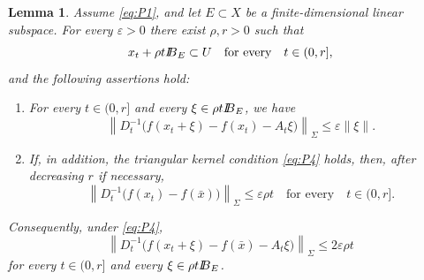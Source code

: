 \documentclass[10pt,a4paper]{amsart}
\newtheorem{lemma}{Lemma}
\def\ball{{I\kern -.35em B}}
\newcommand{\bx}{\bar x}
\begin{document}
	\begin{lemma}
		\label{lem:p-factor-scaled-error}
		Assume \eqref{eq:P1}, and let $E\subset X$ be a finite-dimensional
		linear subspace. For every $\varepsilon>0$ there exist $\rho,r>0$ such
		that
		$$
		x_t+\rho t\ball_E\subset U
		\quad\text{for every}\quad t\in(0,r],
		$$
		and the following assertions hold:
		\begin{enumerate}[label={\rm (\roman*)}]
			
			\item For every $t\in(0,r]$ and every $\xi\in\rho t\ball_E$, we have
			\begin{equation}
				\left\|D_t^{-1}
				\bigl(f(x_t+\xi)-f(x_t)-A_t\xi\bigr)
				\right\|_\Sigma
				\le\varepsilon\|\xi\|.
				\label{eq:P7}
			\end{equation}
			
			\item If, in addition, the triangular kernel condition
			\eqref{eq:P4} holds, then, after decreasing $r$ if necessary,
			\begin{equation}
				\left\|D_t^{-1}
				\bigl(f(x_t)-f(\bx)\bigr)
				\right\|_\Sigma
				\le\varepsilon\rho t
				\quad\text{for every}\quad t\in(0,r].
				\label{eq:P10}
			\end{equation}
			
		\end{enumerate}
		Consequently, under \eqref{eq:P4},
		\begin{equation}
			\left\|D_t^{-1}
			\bigl(f(x_t+\xi)-f(\bx)-A_t\xi\bigr)
			\right\|_\Sigma
			\le 2\varepsilon\rho t
			\label{eq:centered-scaled-error}
		\end{equation}
		for every $t\in(0,r]$ and every $\xi\in\rho t\ball_E$.
	\end{lemma}
\end{document}
